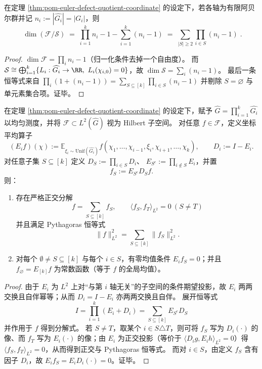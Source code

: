 \begin{corollary}\label{cor:pom-euler-defect-dimension-formula}
在定理 \ref{thm:pom-euler-defect-quotient-coordinate} 的设定下，若各轴为有限阿贝尔群并记
\(
n_i:=|\widehat{G_i}|=|G_i|
\)，则
\[
\boxed{\;
\dim(\mathcal{F}/\mathcal{S})
\;=\;
\prod_{i=1}^k n_i - 1 - \sum_{i=1}^k (n_i-1)
\;=\;
\sum_{|S|\ge 2}\prod_{i\in S}(n_i-1)\; }.
\]
\end{corollary}
\begin{proof}
\(\dim\mathcal{F}=\prod_i n_i-1\)（归一化条件去掉一个自由度）。
而 \(\mathcal{S}\cong\bigoplus_{i=1}^k\{L_i:\widehat{G_i}\to\RR,\ L_i(\chi_{i,0})=0\}\)，故
\(\dim\mathcal{S}=\sum_i(n_i-1)\)。
最后一条恒等式来自
\(
\prod_i(1+(n_i-1))=\sum_{S\subseteq[k]}\prod_{i\in S}(n_i-1)
\)
并剔除 \(S=\varnothing\) 与单元素集合项。证毕。
\end{proof}

\begin{theorem}\label{thm:pom-euler-defect-orthogonal-pythagoras}
在定理 \ref{thm:pom-euler-defect-quotient-coordinate} 的设定下，赋予 \(\widehat G=\prod_{i=1}^k\widehat{G_i}\) 以均匀测度，并将 \(\mathcal F\subset L^2(\widehat G)\) 视为 Hilbert 子空间。
对任意 \(f\in\mathcal F\)，定义坐标平均算子
\[
(E_i f)(\chi):=\mathbb{E}_{\xi_i\sim \mathrm{Unif}(\widehat{G_i})} f(\chi_1,\dots,\chi_{i-1},\xi_i,\chi_{i+1},\dots,\chi_k),
\qquad
D_i:=I-E_i.
\]
对任意子集 \(S\subseteq[k]\) 定义
\(
D_S:=\prod_{i\in S}D_i
\)、
\(
E_{S^c}:=\prod_{i\notin S}E_i
\)，并置
\[
f_S:=E_{S^c}D_S f.
\]
则：
\begin{enumerate}
  \item 存在严格正交分解
  \[
  \boxed{\;
  f=\sum_{S\subseteq[k]} f_S,\qquad
  \langle f_S,f_T\rangle_{L^2}=0\ (S\ne T)\;}
  \]
  并且满足 Pythagoras 恒等式
  \[
  \|f\|_{L^2}^2=\sum_{S\subseteq[k]}\|f_S\|_{L^2}^2.
  \]
  \item 对每个 \(\emptyset\ne S\subseteq[k]\) 与每个 \(i\in S\)，有零均值条件 \(E_i f_S=0\)；并且 \(f_{\varnothing}=E_{[k]}f\) 为常数函数（等于 \(f\) 的全局均值）。
\end{enumerate}
\end{theorem}
\begin{proof}
由于 \(E_i\) 为 \(L^2\) 上对“与第 \(i\) 轴无关”的子空间的条件期望投影，故 \(E_i\) 两两交换且自伴幂等；从而 \(D_i=I-E_i\) 亦两两交换且自伴。
展开恒等式
\[
I=\prod_{i=1}^k(E_i+D_i)=\sum_{S\subseteq[k]}E_{S^c}D_S
\]
并作用于 \(f\) 得到分解式。
若 \(S\ne T\)，取某个 \(i\in S\triangle T\)，则可将 \(f_S\) 写为 \(D_i(\cdot)\) 的像、而 \(f_T\) 写为 \(E_i(\cdot)\) 的像；由 \(E_i\) 为正交投影（等价于 \(\langle D_i g, E_i h\rangle_{L^2}=0\)）得 \(\langle f_S,f_T\rangle_{L^2}=0\)，从而得到正交与 Pythagoras 恒等式。
而对 \(i\in S\)，由定义 \(f_S\) 含有因子 \(D_i\)，故 \(E_i f_S=E_iD_i(\cdot)=0\)。证毕。
\end{proof}

